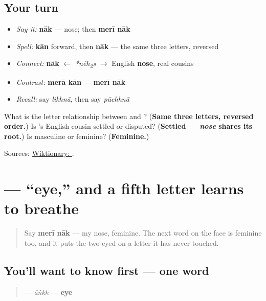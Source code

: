 \subsection*{Your turn}
\begin{itemize}
\raggedright
  \item \emph{Say it:} \textbf{nāk} — nose; then \textbf{merī nāk}
  \item \emph{Spell:} \textbf{kān} forward, then \textbf{nāk} — the same three letters, reversed
  \item \emph{Connect:} \textbf{nāk} $\leftarrow$ \emph{*néh\textsubscript{2}s} $\to$ English \textbf{nose}, real cousins
  \item \emph{Contrast:} \textbf{merā kān} — \textbf{merī nāk}
  \item \emph{Recall:} say \emph{likhnā}, then say \emph{pūchhnā}
\end{itemize}

\begin{tcolorbox}[breakable,colback=teal!4,colframe=teal!35!black,title={Before you move on}]
What is the letter relationship between \textbf{} and \textbf{}? (\textbf{Same three letters, reversed order.}) Is \textbf{}'s English cousin settled or disputed? (\textbf{Settled — \emph{nose} shares its root.}) Is \textbf{} masculine or feminine? (\textbf{Feminine.})

Sources: \href{https://en.wiktionary.org/wiki/\%D9\%86\%D8\%A7\%DA\%A9}{Wiktionary: }.
\end{tcolorbox}
\section[\texorpdfstring{\ur{آنکھ} (āṅkh)}{آنکھ (āṅkh)}]{ — \textquotedblleft{}eye,\textquotedblright{} and a fifth letter learns to breathe}

\label{lesson:UR-C10-aankh}



\begin{quote}
Say \textbf{merī nāk} — my nose, feminine. The next word on the face is feminine too, and it puts the two-eyed \textbf{} on a letter it has never touched.
\end{quote}

\subsection*{You'll want to know first — one word}
\begin{quote}
\textbf{} — \emph{āṅkh} — \textbf{eye}
\end{quote}

